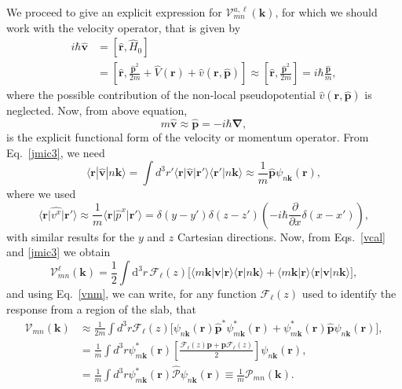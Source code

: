 We proceed to give an explicit expression for 
$\mathcal{V}^{a,\ell}_{mn}(\mathbf{k})$,
for which we should work with  
the velocity operator, that is given by
\begin{align}\label{vop2} 
i\hbar\hat{\mathbf{v}}&=[\hat{\mathbf{r}},\hat{H}_0]
\nonumber\\
&=
[\hat{\mathbf{r}},\frac{\hat{\mathbf{p}}^2}{2m} +
\hat{V}(\mathbf{r})+\hat{v}(\mathbf{r},\hat{\mathbf{p}})]
\approx
[\hat{\mathbf{r}},\frac{\hat{\mathbf{p}}^2}{2m}]=i\hbar\frac{\hat{\mathbf{p}}}{m},
\end{align} 
where the possible contribution of 
the non-local pseudopotential $\hat{v}(\mathbf{r},\hat{\mathbf{p}})$
is neglected. Now, from above equation,
\begin{equation}\label{velo}
m\hat{\mathbf{v}}\approx\hat{\mathbf{p}}=-i\hbar\boldsymbol{\nabla},
\end{equation}
is the explicit functional form of the velocity or momentum operator.
From Eq.~\eqref{jmic3}, we need 
\begin{equation}\label{vnm}
\langle \mathbf{r} | \hat{\mathbf v} | n\mathbf{k} \rangle
=\int d^3 r' \langle\mathbf{r}\vert\hat{\mathbf{v}}\vert\mathbf{r}'\rangle
\langle\mathbf{r}'\vert n\mathbf{k}\rangle
\approx\frac{1}{m}\hat{\mathbf{p}}\psi_{n\mathbf{k}}(\mathbf{r}),
\end{equation} 
where we used 
\begin{equation}\label{rvnk}
\langle\mathbf{r}\vert\hat{v^x}\vert\mathbf{r}'\rangle
\approx \frac{1}{m}\langle\mathbf{r}\vert\hat{p}^x\vert\mathbf{r}'\rangle
=
\delta(y-y')\delta(z-z')\left(-i\hbar\frac{\partial}{\partial x}\delta(x-x')\right),
\end{equation}
with similar results for the $y$ and $z$ Cartesian directions.
Now, from 
Eqs.~\eqref{vcal} and \eqref{jmic3} we obtain
\begin{equation}
{\boldsymbol{\mathcal{V}}}^{\ell}_{mn}({\mathbf k})=
\frac{1}{2}
\int \mathrm{d}^3 r\,
 \mathcal{F}_\ell(z)
\bigg[
\langle m\mathbf{k}|\mathbf{v} | \mathbf{r}\rangle
\langle \mathbf{r} | n \mathbf k \rangle +
\langle m\mathbf{k} | \mathbf{r}\rangle
\langle \mathbf{r} | \mathbf{v} | n \mathbf k \rangle\bigg],
\label{intj}
\end{equation}   
and using Eq.~\eqref{vnm},
we can write, for any  function $\mathcal{F}_\ell(z)$ used
to identify the response from a region of the slab, that
\begin{align}%
{\boldsymbol{\mathcal{V}}}_{mn}(\mathbf{k})&\approx
\frac{1}{2m}\int d^3 r
\mathcal{F}_\ell(z)
 \bigg[
\psi_{n\mathbf{k}}(\mathbf{r})
\hat{\mathbf{p}}^*\psi^*_{m\mathbf{k}}(\mathbf{r})
+ 
\psi^*_{m\mathbf{k}}(\mathbf{r})\hat{\mathbf{p}}
\psi_{n\mathbf{k}}(\mathbf{r})
\bigg], \label{pofs1}  \\
&=
\frac{1}{m}\int d^3 r
\psi^*_{m\mathbf{k}}(\mathbf{r})
\left[\frac{\mathcal{F}_\ell(z) \mathbf{p} +
\mathbf{p} \mathcal{F}_\ell(z)}{2}\right]
\psi_{n\mathbf{k}}(\mathbf{r})
,\label{pofs2} \\
&=\frac{1}{m}\int d^3 r
\psi^*_{m\mathbf{k}}(\mathbf{r})\hat{\boldsymbol{\mathcal{P}}}
\psi_{n\mathbf{k}}(\mathbf{r})\equiv \frac{1}{m}{\boldsymbol{\mathcal{P}}}_{mn}(\mathbf{k}).
\end{align}
